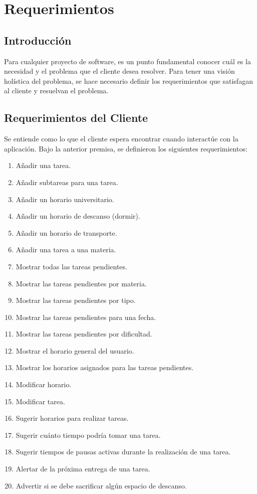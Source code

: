
\chapter{Requerimientos}
\section{Introducción}
Para cualquier proyecto de software, es un punto fundamental conocer cuál es la necesidad y el problema que el cliente desea resolver. Para tener una visión holística del problema, se hace necesario definir los requerimientos que satisfagan al cliente y resuelvan el problema.
\newpage

\section{Requerimientos del Cliente}
Se entiende como lo que el cliente espera encontrar cuando interactúe con la aplicación. Bajo la anterior premisa, se definieron los siguientes requerimientos:
\begin{enumerate}
	\item Añadir una tarea.
	\item Añadir subtareas para una tarea.
	\item Añadir un horario universitario.
	\item Añadir un horario de descanso (dormir).
	\item Añadir un horario de transporte.
	\item Añadir una tarea a una materia.
	\item Mostrar todas las tareas pendientes.
	\item Mostrar las tareas pendientes por materia.
	\item Mostrar las tareas pendientes por tipo.
	\item Mostrar las tareas pendientes para una fecha.
	\item Mostrar las tareas pendientes por dificultad.
	\item Mostrar el horario general del usuario.
	\item Mostrar los horarios asignados para las tareas pendientes.
	\item Modificar horario.
	\item Modificar tarea.
	\item Sugerir horarios para realizar tareas.
	\item Sugerir cuánto tiempo podría tomar una tarea.
	\item Sugerir tiempos de pausas activas durante la realización de una tarea.
	\item Alertar de la próxima entrega de una tarea.
	\item Advertir si se debe sacrificar algún espacio de descanso.

\end{enumerate}


